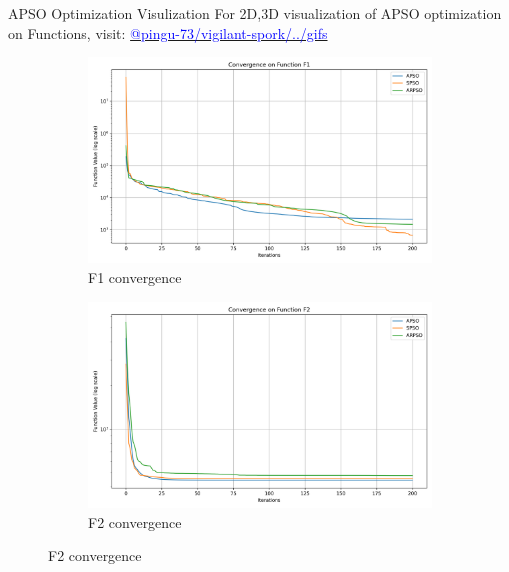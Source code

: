\documentclass[aspectratio=169]{beamer}
\begin{document}
\begin{frame}{APSO Optimization Visulization}
    \vspace{-1ex}
    {\scriptsize For 2D,3D visualization of APSO optimization on Functions, visit: 
    \href{https://github.com/pingu-73/vigilant-spork/tree/main/plots/cec_bench/gifs}{\textcolor{blue}{@pingu-73/vigilant-spork/../gifs}}}
\end{frame}

\begin{frame}
    \centering
    \begin{figure}
        \centering
        \begin{subfigure}[b]{0.19\textwidth}
            \includegraphics[width=\textwidth]{../plots/cec_bench/cec_convergence_f1.png}
            \caption*{F1 convergence}
        \end{subfigure}
        \hfill
        \begin{subfigure}[b]{0.19\textwidth}
            \includegraphics[width=\textwidth]{../plots/cec_bench/cec_convergence_f2.png}
            \caption*{F2 convergence}
        \end{subfigure}

\end{figure}
\end{frame}
\end{document}
